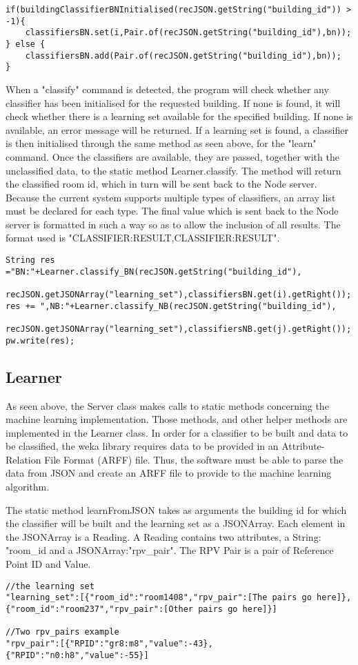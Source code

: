 \begin{lstlisting}
if(buildingClassifierBNInitialised(recJSON.getString("building_id")) > -1){
	classifiersBN.set(i,Pair.of(recJSON.getString("building_id"),bn));
} else {
	classifiersBN.add(Pair.of(recJSON.getString("building_id"),bn));
}
\end{lstlisting}

When a "classify" command is detected, the program will check whether any classifier has been initialised for the requested building. If none is found, it will check whether there is a learning set available for the specified building. If none is available, an error message will be returned. If a learning set is found, a classifier is then initialised through the same method as seen above, for the "learn" command. Once the classifiers are available, they are passed, together with the unclassified data, to the static method Learner.classify. The method will return the classified room id, which in turn will be sent back to the Node server. Because the current system supports multiple types of classifiers, an array list must be declared for each type. The final value which is sent back to the Node server is formatted in such a way so as to allow the inclusion of all results. The format used is "CLASSIFIER:RESULT,CLASSIFIER:RESULT".
\begin{lstlisting}
String res ="BN:"+Learner.classify_BN(recJSON.getString("building_id"),
                  	recJSON.getJSONArray("learning_set"),classifiersBN.get(i).getRight());
res += ",NB:"+Learner.classify_NB(recJSON.getString("building_id"),
              	recJSON.getJSONArray("learning_set"),classifiersNB.get(j).getRight());
pw.write(res);
\end{lstlisting} 

\subsection{Learner}
As seen above, the Server class makes calls to static methods concerning the machine learning implementation. Those methods, and other helper methods are implemented in the Learner class. In order for a classifier to be built and data to be classified, the weka library requires data to be provided in an Attribute-Relation File Format (ARFF) file. Thus, the software must be able to parse the data from JSON and create an ARFF file to provide to the machine learning algorithm.

\noindent
The static method learnFromJSON takes as arguments the building id for which the classifier will be built and the learning set as a JSONArray. Each element in the JSONArray is a Reading. A Reading contains two attributes, a String: "room\_id and a JSONArray:"rpv\_pair". The RPV Pair is a pair of Reference Point ID and Value. 
\begin{lstlisting}
//the learning set
"learning_set":[{"room_id":"room1408","rpv_pair":[The pairs go here]},{"room_id":"room237","rpv_pair":[Other pairs go here]}]

//Two rpv_pairs example
"rpv_pair":[{"RPID":"gr8:m8","value":-43},{"RPID":"n0:h8","value":-55}]
\end{lstlisting}

